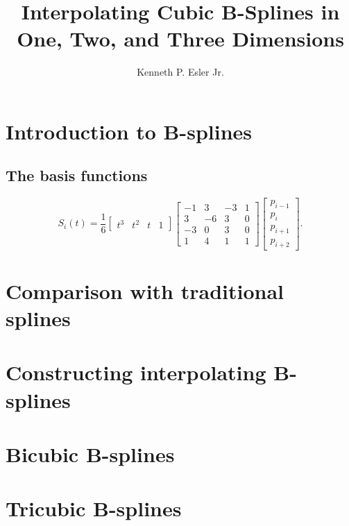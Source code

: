\documentclass{article}
\title{Interpolating Cubic B-Splines in One, Two, and Three Dimensions}
\author{Kenneth P. Esler Jr.}
\begin{document}
\maketitle
\section{Introduction to B-splines}


\subsection{The basis functions}


\begin{equation}
S_i(t) = \frac{1}{6} \left[
\begin{array}{cccc}
t^3 & t^2 & t & 1
\end{array}
\right]
\left[\begin{array}{rrrr}
-1 &  3 & -3 & 1 \\
 3 & -6 &  3 & 0 \\
-3 &  0 &  3 & 0 \\
 1 &  4 &  1 & 1
\end{array}\right]
\left[\begin{array}{l}
p_{i-1} \\ p_i \\ p_{i+1} \\ p_{i+2}
\end{array}\right].
\end{equation}

\section{Comparison with traditional splines}

\section{Constructing interpolating B-splines}

\section{Bicubic B-splines}

\section{Tricubic B-splines}
\end{document}
